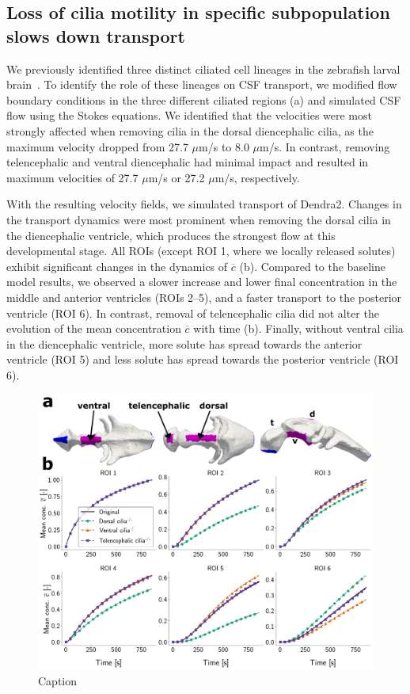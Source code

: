 \documentclass[fleqn]{wlscirep}
\newcommand{\cbar}{\overline{c}}
\begin{document}
\subsection*{Loss of cilia motility in specific subpopulation slows down transport}
We previously identified three distinct ciliated cell lineages in the
zebrafish larval brain~\cite{Olstad2019CiliaryDevelopment, DGama2025MotileBrain}.
To identify the role of these lineages on CSF transport, we modified flow boundary conditions
in the three different ciliated regions (a) and simulated
CSF flow using the Stokes equations. We identified that the velocities were most strongly
affected when removing cilia in the dorsal diencephalic cilia,
as the maximum velocity dropped from 27.7 $\mu$m/s to 8.0 $\mu$m/s.
In contrast, removing telencephalic and ventral diencephalic had minimal
impact and resulted in maximum velocities of 27.7 $\mu$m/s or 27.2 $\mu$m/s, respectively.

With the resulting velocity fields, we simulated transport of Dendra2.
Changes in the transport dynamics were most prominent when removing the dorsal cilia
in the diencephalic ventricle, which produces the strongest flow at this developmental stage.
All ROIs (except ROI 1, where we locally released solutes) exhibit significant changes
in the dynamics of $\cbar$ (b).
Compared to the baseline model results, we observed a slower increase and lower final concentration
in the middle and anterior ventricles (ROIs 2--5),
and a faster transport to the posterior ventricle (ROI 6).
In contrast, removal of telencephalic cilia did not alter the evolution of the
mean concentration $\cbar$ with time (b).
Finally, without ventral cilia in the diencephalic ventricle,
more solute has spread towards the anterior ventricle (ROI 5) and
less solute has spread towards the posterior ventricle (ROI 6).

\begin{figure}[H]
    \centering
    \includegraphics[width=\textwidth]{graphics/figure5_compare_cilia_modifications.png}
    \caption{Caption}
    \label{fig:figure5_compare_cilia_modifications}
\end{figure}
\end{document}
